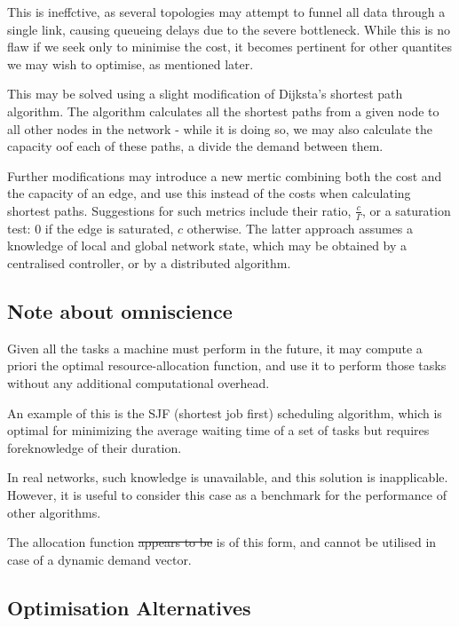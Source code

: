 \documentclass{amsart}
\begin{document}
    This is ineffctive, as several topologies may attempt to funnel all data through a single link, causing queueing delays due to the severe bottleneck. While this is no flaw if we seek only to minimise the cost, it becomes pertinent for other quantites we may wish to optimise, as mentioned later.

    This may be solved using a slight modification of Dijksta's shortest path algorithm. The algorithm calculates all the shortest paths from a given node to all other nodes in the network - while it is doing so, we may also calculate the capacity oof each of these paths, a divide the demand between them. 

    Further modifications may introduce a new mertic combining both the cost and the capacity of an edge, and use this instead of the costs when calculating shortest paths. Suggestions for such metrics include their ratio, \(\frac{c}{\Gamma}\), or a saturation test: 0 if the edge is saturated, \(c\) otherwise. The latter approach assumes a knowledge of local and global network state, which may be obtained by a centralised controller, or by a distributed algorithm. 

    \subsection{Note about omniscience}

    Given all the tasks a machine must perform in the future, it may compute a priori the optimal resource-allocation function, and use it to perform those tasks without any additional computational overhead. 
    
    An example of this is the SJF (shortest job first) scheduling algorithm, which is optimal for minimizing the average waiting time of a set of tasks but requires foreknowledge of their duration.

    In real networks, such knowledge is unavailable, and this solution is inapplicable. However, it is useful to consider this case as a benchmark for the performance of other algorithms.

    The allocation function \sout{appears to be} is of this form, and cannot be utilised in case of a dynamic demand vector.

    \subsection{Optimisation Alternatives}
\end{document}
